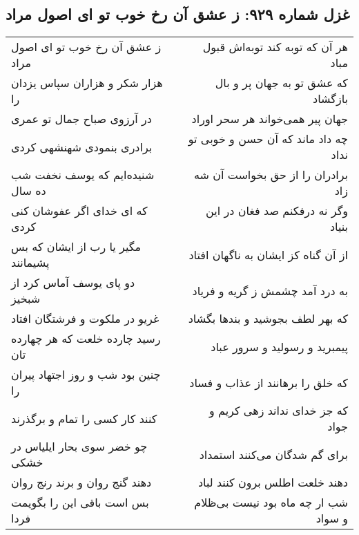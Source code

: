 \begin{center}
\section*{غزل شماره ۹۲۹: ز عشق آن رخ خوب تو ای اصول مراد}
\label{sec:0929}
\begin{longtable}{l p{0.5cm} r}
ز عشق آن رخ خوب تو ای اصول مراد
&&
هر آن که توبه کند توبه‌اش قبول مباد
\\
هزار شکر و هزاران سپاس یزدان را
&&
که عشق تو به جهان پر و بال بازگشاد
\\
در آرزوی صباح جمال تو عمری
&&
جهان پیر همی‌خواند هر سحر اوراد
\\
برادری بنمودی شهنشهی کردی
&&
چه داد ماند که آن حسن و خوبی تو نداد
\\
شنیده‌ایم که یوسف نخفت شب ده سال
&&
برادران را از حق بخواست آن شه زاد
\\
که ای خدای اگر عفوشان کنی کردی
&&
وگر نه درفکنم صد فغان در این بنیاد
\\
مگیر یا رب از ایشان که بس پشیمانند
&&
از آن گناه کز ایشان به ناگهان افتاد
\\
دو پای یوسف آماس کرد از شبخیز
&&
به درد آمد چشمش ز گریه و فریاد
\\
غریو در ملکوت و فرشتگان افتاد
&&
که بهر لطف بجوشید و بندها بگشاد
\\
رسید چارده خلعت که هر چهارده تان
&&
پیمبرید و رسولید و سرور عباد
\\
چنین بود شب و روز اجتهاد پیران را
&&
که خلق را برهانند از عذاب و فساد
\\
کنند کار کسی را تمام و برگذرند
&&
که جز خدای نداند زهی کریم و جواد
\\
چو خضر سوی بحار ایلیاس در خشکی
&&
برای گم شدگان می‌کنند استمداد
\\
دهند گنج روان و برند رنج روان
&&
دهند خلعت اطلس برون کنند لباد
\\
بس است باقی این را بگویمت فردا
&&
شب ار چه ماه بود نیست بی‌ظلام و سواد
\\
\end{longtable}
\end{center}
